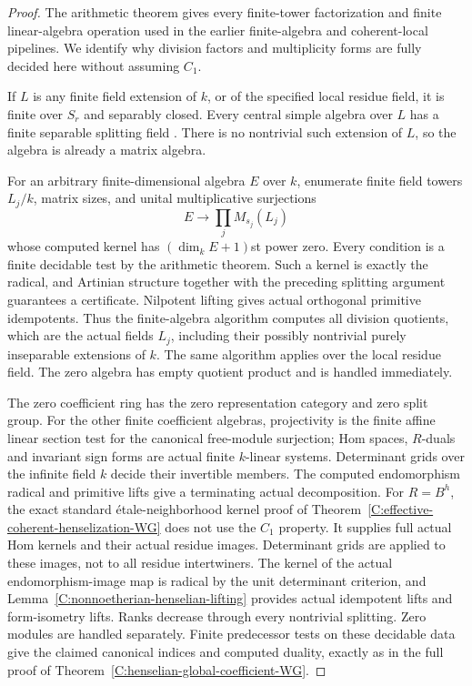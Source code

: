 \begin{proof}
The arithmetic theorem gives every
finite-tower factorization and
finite linear-algebra operation
used in the earlier finite-algebra
and coherent-local pipelines.
We identify why division factors
and multiplicity forms are fully
decided here without assuming $C_1$.

If $L$ is any finite field
extension of $k$, or of the
specified local residue field,
it is finite over $S_r$ and
separably closed.
Every central simple algebra
over $L$ has a finite separable
splitting field
\cite[Proposition 11.8.5, Tag 0752]
{C-StacksGlobalFunctionArithmetic}.
There is no nontrivial such
extension of $L$, so the algebra
is already a matrix algebra.

For an arbitrary finite-dimensional
algebra $E$ over $k$, enumerate
finite field towers $L_j/k$,
matrix sizes, and unital
multiplicative surjections
\[
                 E\longrightarrow\prod_j M_{s_j}(L_j)
\]
whose computed kernel has
$(\dim_kE+1)$st power zero.
Every condition is a finite
decidable test by the arithmetic
theorem.  Such a kernel is
exactly the radical, and
Artinian structure together
with the preceding splitting
argument guarantees a certificate.
Nilpotent lifting gives actual
orthogonal primitive idempotents.
Thus the finite-algebra algorithm
computes all division quotients,
which are the actual fields
$L_j$, including their possibly
nontrivial purely inseparable
extensions of $k$.
The same algorithm applies
over the local residue field.
The zero algebra has empty quotient
product and is handled immediately.

The zero coefficient ring has the
zero representation category and
zero split group.  For the other
finite coefficient algebras,
projectivity is the finite affine
linear section test for the
canonical free-module surjection;
Hom spaces, $R$-duals and invariant
sign forms are actual finite
$k$-linear systems.
Determinant grids over the
infinite field $k$ decide their
invertible members.
The computed endomorphism radical
and primitive lifts give a
terminating actual decomposition.
For $R=B^h$, the exact standard
\'{e}tale-neighborhood kernel proof
of Theorem~\ref{C:effective-coherent-henselization-WG}
does not use the $C_1$ property.
It supplies full actual Hom
kernels and their actual
residue images.  Determinant
grids are applied to these
images, not to all residue
intertwiners.
The kernel of the actual
endomorphism-image map is
radical by the unit determinant
criterion, and
Lemma~\ref{C:nonnoetherian-henselian-lifting}
provides actual idempotent lifts
and form-isometry lifts.
Ranks decrease through every
nontrivial splitting.
Zero modules are handled separately.
Finite predecessor tests on
these decidable data give
the claimed canonical indices
and computed duality, exactly
as in the full proof of
Theorem~\ref{C:henselian-global-coefficient-WG}.


\end{proof}
